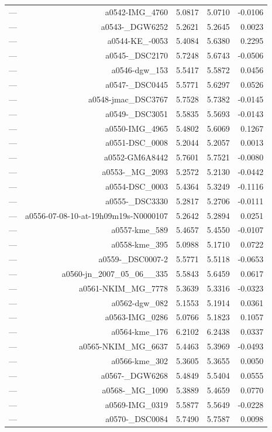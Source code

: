 \begin{table}[htbp]
\begin{tabular}{lrrrr}
— & a0542-IMG_4760 & 5.0817 & 5.0710 & -0.0106 \\
— & a0543-_DGW6252 & 5.2621 & 5.2645 & 0.0023 \\
— & a0544-KE_-0053 & 5.4084 & 5.6380 & 0.2295 \\
— & a0545-_DSC2170 & 5.7248 & 5.6743 & -0.0506 \\
— & a0546-dgw_153 & 5.5417 & 5.5872 & 0.0456 \\
— & a0547-_DSC0445 & 5.5771 & 5.6297 & 0.0526 \\
— & a0548-jmac_DSC3767 & 5.7528 & 5.7382 & -0.0145 \\
— & a0549-_DSC3051 & 5.5835 & 5.5693 & -0.0143 \\
— & a0550-IMG_4965 & 5.4802 & 5.6069 & 0.1267 \\
— & a0551-DSC_0008 & 5.2044 & 5.2057 & 0.0013 \\
— & a0552-GM6A8442 & 5.7601 & 5.7521 & -0.0080 \\
— & a0553-_MG_2093 & 5.2572 & 5.2130 & -0.0442 \\
— & a0554-DSC_0003 & 5.4364 & 5.3249 & -0.1116 \\
— & a0555-_DSC3330 & 5.2817 & 5.2706 & -0.0111 \\
— & a0556-07-08-10-at-19h09m19s-N0000107 & 5.2642 & 5.2894 & 0.0251 \\
— & a0557-kme_589 & 5.4657 & 5.4550 & -0.0107 \\
— & a0558-kme_395 & 5.0988 & 5.1710 & 0.0722 \\
— & a0559-_DSC0007-2 & 5.5771 & 5.5118 & -0.0653 \\
— & a0560-jn_2007_05_06__335 & 5.5843 & 5.6459 & 0.0617 \\
— & a0561-NKIM_MG_7778 & 5.3639 & 5.3316 & -0.0323 \\
— & a0562-dgw_082 & 5.1553 & 5.1914 & 0.0361 \\
— & a0563-IMG_0286 & 5.0766 & 5.1823 & 0.1057 \\
— & a0564-kme_176 & 6.2102 & 6.2438 & 0.0337 \\
— & a0565-NKIM_MG_6637 & 5.4463 & 5.3969 & -0.0493 \\
— & a0566-kme_302 & 5.3605 & 5.3655 & 0.0050 \\
— & a0567-_DGW6268 & 5.4849 & 5.5404 & 0.0555 \\
— & a0568-_MG_1090 & 5.3889 & 5.4659 & 0.0770 \\
— & a0569-IMG_0319 & 5.5877 & 5.5649 & -0.0228 \\
— & a0570-_DSC0084 & 5.7490 & 5.7587 & 0.0098 \\

\end{tabular}
\end{table}
